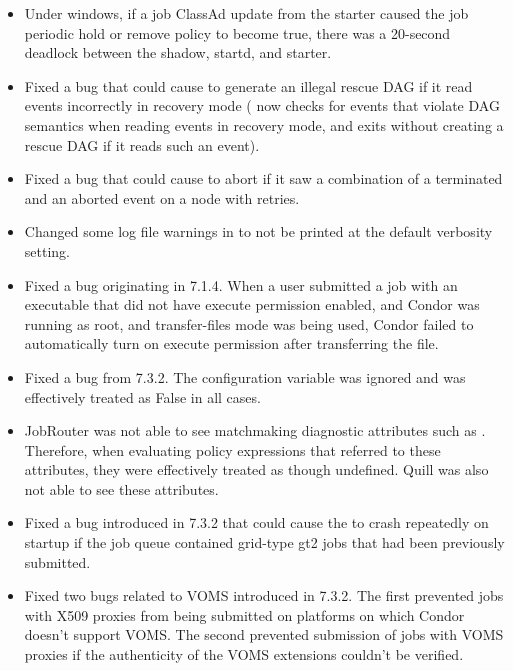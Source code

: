 \begin{itemize}

\item Under windows, if a job ClassAd update from the starter caused the
job periodic hold or remove policy to become true, there was a 20-second
deadlock between the shadow, startd, and starter.

\item Fixed a bug that could cause  to generate an
illegal rescue DAG if it read events incorrectly in recovery mode
( now checks for events that violate DAG semantics
when reading events in recovery mode, and exits without creating a
rescue DAG if it reads such an event).

\item Fixed a bug that could cause  to abort if it saw
a combination of a terminated and an aborted event on a node with
retries.

\item Changed some log file warnings in  to not be
printed at the default verbosity setting.

\item Fixed a bug originating in 7.1.4.  When a user submitted a job
with an executable that did not have execute permission enabled, and
Condor was running as root, and transfer-files mode was being used,
Condor failed to automatically turn on execute permission after
transferring the file.

\item Fixed a bug from 7.3.2.  The configuration variable
 was ignored and was effectively
treated as False in all cases.

\item JobRouter was not able to see matchmaking diagnostic attributes
such as .  Therefore, when evaluating policy
expressions that referred to these attributes, they were effectively
treated as though undefined.  Quill was also not able to see these
attributes.

\item Fixed a bug introduced in 7.3.2 that could cause the
 to crash repeatedly on startup if the job queue
contained grid-type gt2 jobs that had been previously submitted.

\item Fixed two bugs related to VOMS introduced in 7.3.2. The first
prevented jobs with X509 proxies from being submitted on platforms
on which Condor doesn't support VOMS. The second prevented submission
of jobs with VOMS proxies if the authenticity of the VOMS extensions
couldn't be verified.


\end{itemize}

